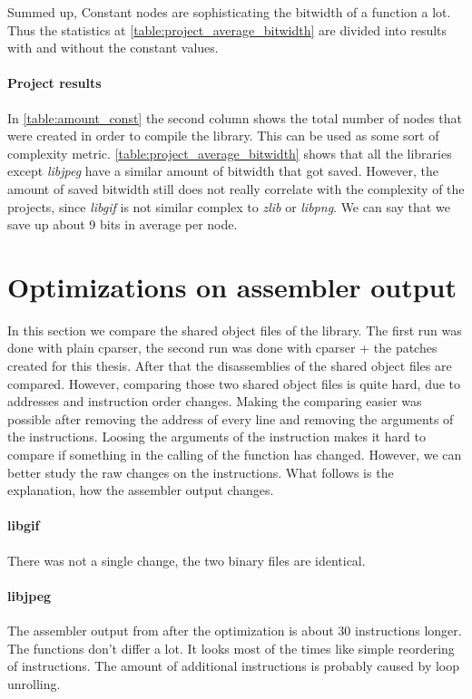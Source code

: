 Summed up, Constant nodes are sophisticating the bitwidth of a function a lot. Thus the statistics at \ref{table:project_average_bitwidth} are divided into results with and without the constant values.

\paragraph{Project results}

In \autoref{table:amount_const} the second column shows the total number of nodes that were created in order to compile the library. This can be used as some sort of complexity metric. 
\autoref{table:project_average_bitwidth} shows that all the libraries except \textit{libjpeg} have a similar amount of bitwidth that got saved. However, the amount of saved bitwidth still does not really correlate with the complexity of the projects, since \textit{libgif} is not similar complex to \textit{zlib} or \textit{libpng}.\newline
We can say that we save up about 9 bits in average per node.

\section{Optimizations on assembler output}

In this section we compare the shared object files of the library. The first run was done with plain cparser, the second run was done with cparser + the patches created for this thesis.\newline
After that the disassemblies of the shared object files are compared. However, comparing those two shared object files is quite hard, due to addresses and instruction order changes. Making the comparing easier was possible after removing the address of every line and removing the arguments of the instructions. Loosing the arguments of the instruction makes it hard to compare if something in the calling of the function has changed. However, we can better study the raw changes on the instructions. What follows is the explanation, how the assembler output changes.

\paragraph{libgif} There was not a single change, the two binary files are identical.
\paragraph{libjpeg} The assembler output from after the optimization is about 30 instructions longer. The functions don't differ a lot. It looks most of the times like simple reordering of instructions. The amount of additional instructions is probably caused by loop unrolling.


